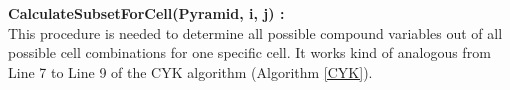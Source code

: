 \noindent \textbf{CalculateSubsetForCell(Pyramid, i, j) :}\\
This procedure is needed to determine all possible compound variables out of all possible cell combinations for one specific cell. It works kind of analogous from Line 7 to Line 9 of the CYK algorithm (Algorithm \ref{CYK}).\\

\noindent {}
~~


